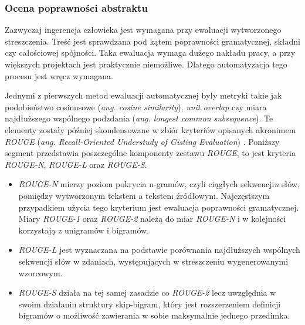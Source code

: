 \documentclass[12pt,a4paper,twoside]{article}
\begin{document}
\subsubsection{Ocena poprawności abstraktu}
Zazwyczaj ingerencja człowieka jest wymagana przy ewaluacji wytworzonego streszczenia. Treść jest sprawdzana pod kątem poprawności gramatycznej, składni czy całościowej spójności. Taka ewaluacja wymaga dużego nakładu pracy, a przy większych projektach jest praktycznie niemożliwe. Dlatego automatyzacja tego procesu jest wręcz wymagana.\par
Jednymi z pierwszych metod ewaluacji automatycznej były metryki takie jak podobieństwo cosinusowe (\textit{ang. cosine similarity}), \textit{unit overlap} czy miara najdłuższego wspólnego podzdania (\textit{ang. longest common subsequence}). Te elementy zostały później skondensowane w zbiór kryteriów opisanych akronimem \textit{ROUGE} (\textit{ang. Recall-Oriented Understudy of Gisting Evaluation}) \cite{rouge}. Poniższy segment przedstawia poszczególne komponenty zestawu \textit{ROUGE}, to jest kryteria \textit{ROUGE-N}, \textit{ROUGE-L} oraz \textit{ROUGE-S}.\par
\begin{itemize}
	\item \textit{ROUGE-N} mierzy poziom pokrycia n-gramów, czyli ciągłych sekwencji\break \textit{n} słów, pomiędzy wytworzonym tekstem a tekstem źródłowym. Najczęstszym przypadkiem użycia tego kryterium jest ewaluacja poprawności gramatycznej. Miary \textit{ROUGE-1} oraz \textit{ROUGE-2} należą do miar \textit{ROUGE-N} i w kolejności korzystają z unigramów i bigramów.
	\item \textit{ROUGE-L} jest wyznaczana na podstawie porównania najdłuższych wspólnych sekwencji słów w zdaniach, występujących w streszczeniu wygenerowanym\break i wzorcowym. 
	\item \textit{ROUGE-S} działa na tej samej zasadzie co \textit{ROUGE-2} lecz uwzględnia w swoim działaniu struktury skip-bigram, który jest rozszerzeniem definicji bigramów o możliwość zawierania w sobie maksymalnie jednego przedimka.
\end{itemize}
\end{document}
